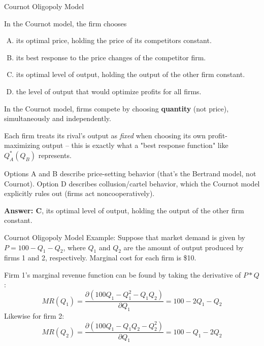 \documentclass{beamer}
\begin{document}
\begin{frame}{Cournot Oligopoly Model}


  In the Cournot model, the firm chooses

  \begin{enumerate}[A)]
    \item its optimal price, holding the price of its competitors constant.
    \item its best response to the price changes of the competitor firm.
    \item its optimal level of output, holding the output of the other firm constant.
    \item the level of output that would optimize profits for all firms.
  \end{enumerate}
\end{frame}

\begin{frame}


  \bigskip
  In the Cournot model, firms compete by choosing \textbf{quantity} (not price), simultaneously and independently.

  \bigskip
  Each firm treats its rival's output as \emph{fixed} when choosing its own profit-maximizing output -- this is exactly what a "best response function" like $Q_A^*(Q_B)$ represents.

  \bigskip
  Options A and B describe price-setting behavior (that's the Bertrand model, not Cournot). Option D describes collusion/cartel behavior, which the Cournot model explicitly rules out (firms act noncooperatively).

  \bigskip
  \textbf{Answer: C}, its optimal level of output, holding the output of the other firm constant.
\end{frame}

\begin{frame}{Cournot Oligopoly Model}
  Example: Suppose that market demand is given by $P=100-Q_1-Q_2$, where $Q_1$ and $Q_2$ are the amount of output produced by firms 1 and 2, respectively. Marginal cost for each firm is \$10.

  \medskip
  Firm 1's marginal revenue function can be found by taking the derivative of $P*Q$:
  $$
    MR(Q_1)=\frac{\partial (100Q_1-Q_1^2-Q_1Q_2)}{\partial Q_1} = 100 - 2Q_1 - Q_2
  $$
  Likewise for firm 2:
  $$
    MR(Q_2)=\frac{\partial (100Q_1-Q_1Q_2-Q_2^2)}{\partial Q_1} = 100 - Q_1 - 2Q_2
  $$
\end{frame}
\end{document}

